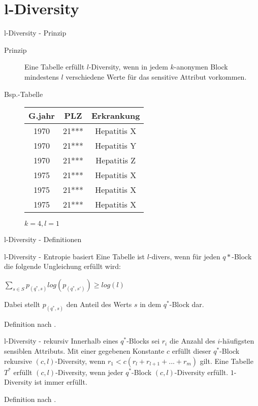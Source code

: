 \section{l-Diversity}

\begin{frame}{l-Diversity - Prinzip}

\begin{description}
	\item[Prinzip] Eine Tabelle erfüllt \(l\)-Diversity, wenn in jedem \(k\)-anonymen Block mindestens \(l\) verschiedene Werte für das sensitive Attribut vorkommen.
    
    \vspace{1.0cm}
    
    \item[Bsp.-Tabelle]
    \small
	\begin{tabular}{|c|c|c|}
	\hline \textbf{G.jahr} & \textbf{PLZ} & \textbf{Erkrankung} \\
	\hline
     1970 & 21*** & Hepatitis X \\ 
	 1970 & 21*** & Hepatitis Y \\ 
	 1970 & 21*** & Hepatitis Z \\
	\hline 
     1975 & 21*** & Hepatitis X \\
     1975 & 21*** & Hepatitis X \\ 
	 1975 & 21*** & Hepatitis X \\ 
	\hline 
	\end{tabular}
	\vspace{0.3cm}

	\(k = 4, l = 1\)
\end{description}

\end{frame}


\begin{frame}{l-Diversity - Definitionen}
	\begin{block}{l-Diversity - Entropie basiert}
    \centering
        Eine Tabelle ist \(l\)-divers, wenn für jeden $q*$-Block die folgende Ungleichung erfüllt wird:
        
    	$\sum\limits_{s \in S} p_{(q^*,s)} log(p_{(q^*,s')}) \geq log(l)$
        
    	Dabei stellt $p_{(q^*,s)}$ den Anteil des Werts $s$ in dem $q^*$-Block dar.
   \end{block}
    \tiny Definition nach \cite{machanavajjhala_l_diversity}.
    
    \vfill
    
	\begin{block}{l-Diversity - rekursiv}
    \centering
		Innerhalb eines $q^*$-Blocks sei $r_i$ die Anzahl des $i$-häufigsten sensiblen Attributs. Mit einer gegebenen Konstante $c$ erfüllt dieser $q^*$-Block rekursive $(c, l)$-Diversity, wenn $r_1 < c(r_l + r_{l+1} + ...  + r_m )$ gilt. Eine Tabelle $T^*$ erfüllt $(c, l)$-Diversity, wenn jeder $q^*$-Block $(c, l)$-Diversity erfüllt. $1$-Diversity ist immer erfüllt.
    \end{block}
    \tiny Definition nach \cite{machanavajjhala_l_diversity}.
\end{frame}


